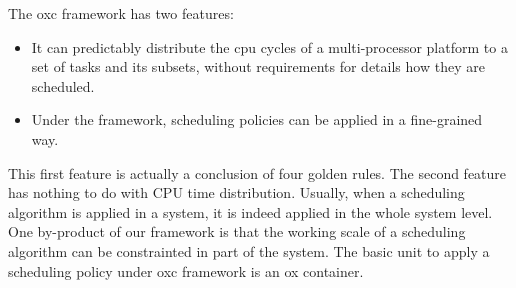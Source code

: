 The oxc framework has two features:
\begin{itemize}
\item It can predictably distribute the cpu cycles of a
  multi-processor platform to a set of tasks and its subsets, without
  requirements for details how they are scheduled.
\item Under the framework, scheduling policies can be applied in a
  fine-grained way.
\end{itemize}
This first feature is actually a conclusion of four golden rules.
The second feature has nothing to do with CPU time distribution.
Usually, when a scheduling algorithm is applied in a system, it is
indeed applied in the whole system level. One by-product of our 
framework is that the working scale of a scheduling algorithm can
be constrainted in part of the system. The basic unit to apply a 
scheduling policy under oxc framework is an ox container.

%
%
%

